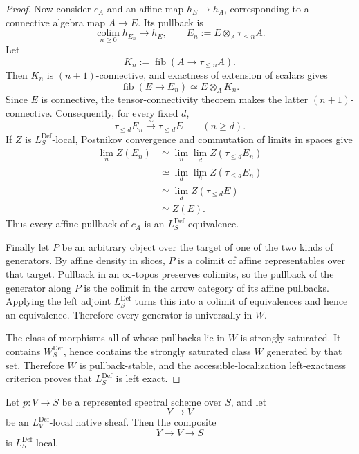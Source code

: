 \begin{proof}
Now consider $c_A$ and an affine map $h_E\to h_A$, corresponding to a
connective algebra map $A\to E$.  Its pullback is
\[
    \operatorname*{colim}_{n\geq0}h_{E_n}
    \longrightarrow h_E,
    \qquad
    E_n:=E\otimes_A\tau_{\leq n}A.
\]
Let
\[
    K_n:=\operatorname{fib}(A\to\tau_{\leq n}A).
\]
Then $K_n$ is $(n+1)$-connective, and exactness of extension of scalars gives
\[
    \operatorname{fib}(E\to E_n)
    \simeq E\otimes_AK_n.
\]
Since $E$ is connective, the tensor-connectivity theorem makes the latter
$(n+1)$-connective.  Consequently, for every fixed $d$,
\[
    \tau_{\leq d}E_n\xrightarrow{\sim}\tau_{\leq d}E
    \qquad(n\geq d).
\]
If $Z$ is $L_S^{\mathrm{Def}}$-local, Postnikov convergence and commutation of
limits in spaces give
\[
\begin{aligned}
    \lim_n Z(E_n)
    &\simeq
    \lim_n\lim_d Z(\tau_{\leq d}E_n)\\
    &\simeq
    \lim_d\lim_n Z(\tau_{\leq d}E_n)\\
    &\simeq
    \lim_d Z(\tau_{\leq d}E)\\
    &\simeq Z(E).
\end{aligned}
\]
Thus every affine pullback of $c_A$ is an
$L_S^{\mathrm{Def}}$-equivalence.

Finally let $P$ be an arbitrary object over the target of one of the two kinds
of generators.  By affine density in slices, $P$ is a colimit of affine
representables over that target.  Pullback in an $\infty$-topos preserves
colimits, so the pullback of the generator along $P$ is the colimit in the
arrow category of its affine pullbacks.  Applying the left adjoint
$L_S^{\mathrm{Def}}$ turns this into a colimit of equivalences and hence an
equivalence.  Therefore every generator is universally in $W$.

The class of morphisms all of whose pullbacks lie in $W$ is strongly
saturated.  It contains $W_S^{\mathrm{Def}}$, hence contains the strongly
saturated class $W$ generated by that set.  Therefore $W$ is pullback-stable,
and the accessible-localization left-exactness criterion proves that
$L_S^{\mathrm{Def}}$ is left exact.
\end{proof}

\begin{lemma}
\label{lem:bnli-def-local-base-composition}
Let $p:V\to S$ be a represented spectral scheme over $S$, and let
\[
    Y\longrightarrow V
\]
be an $L_V^{\mathrm{Def}}$-local native sheaf.  Then the composite
\[
    Y\longrightarrow V\longrightarrow S
\]
is $L_S^{\mathrm{Def}}$-local.
\end{lemma}

